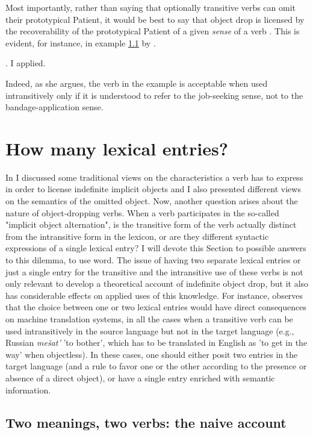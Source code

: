 Most importantly, rather than saying that optionally transitive verbs can omit their prototypical Patient, it would be best to say that object drop is licensed by the recoverability of the prototypical Patient of a given \textit{sense} of a verb \parencite[100]{fillmore1969types}. This is evident, for instance, in example \ref{} by \textcite{iten2005null}.

\ex. \label{iten} I applied.

Indeed, as she argues, the verb in the example is acceptable when used intransitively only if it is understood to refer to the job-seeking sense, not to the bandage-application sense.


\section{How many lexical entries?} 

In  I discussed some traditional views on the characteristics a verb has to express in order to license indefinite implicit objects and I also presented different views on the semantics of the omitted object. Now, another question arises about the nature of object-dropping verbs. When a verb participates in the so-called "implicit object alternation", is the transitive form of the verb actually distinct from the intransitive form in the lexicon, or are they different syntactic expressions of a single lexical entry? I will devote this Section to possible answers to this dilemma, to use  word. The issue of having two separate lexical entries or just a single entry for the transitive and the intransitive use of these verbs is not only relevant to develop a theoretical account of indefinite object drop, but it also has considerable effects on applied uses of this knowledge. For instance, \textcite[118]{McShane2005} observes that the choice between one or two lexical entries would have direct consequences on machine translation systems, in all the cases when a transitive verb can be used intransitively in the source language but not in the target language (e.g., Russian \textit{me\v{s}at'} 'to bother', which has to be translated in English as 'to get in the way' when objectless). In these cases, one should either posit two entries in the target language (and a rule to favor one or the other according to the presence or absence of a direct object), or have a single entry enriched with semantic information.


\subsection{Two meanings, two verbs: the naive account} 


